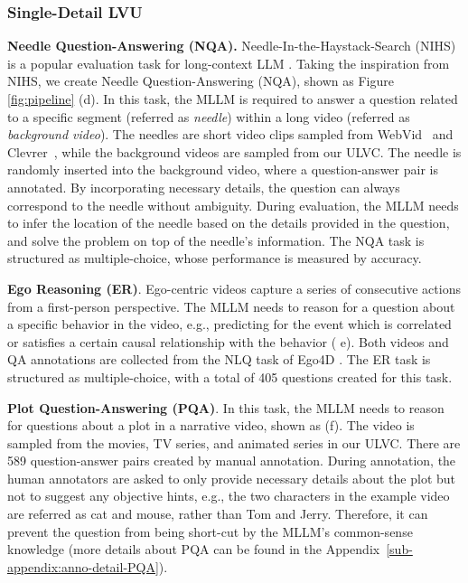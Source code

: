 \subsubsection{Single-Detail LVU}

\textbf{Needle Question-Answering (NQA).} Needle-In-the-Haystack-Search (NIHS) is a popular evaluation task for long-context LLM \cite{liu2024lost}. Taking the inspiration from NIHS, we create Needle Question-Answering (NQA), shown as Figure \ref{fig:pipeline} (d). In this task, the MLLM is required to answer a question related to a specific segment (referred as \textit{needle}) within a long video (referred as \textit{background video}). The needles are short video clips sampled from WebVid~\cite{webvid-2021} and Clevrer~\cite{clevrer-2019}, while the background videos are sampled from our ULVC. The needle is randomly inserted into the background video, where a question-answer pair is annotated. By incorporating necessary details, the question can always correspond to the needle without ambiguity. During evaluation, the MLLM needs to infer the location of the needle based on the details provided in the question, and solve the problem on top of the needle's information. The NQA task is structured as multiple-choice, whose performance is measured by accuracy. 

\noindent\textbf{Ego Reasoning (ER)}. Ego-centric videos capture a series of consecutive actions from a first-person perspective. The MLLM needs to reason for a question about a specific behavior in the video, e.g., predicting for the event which is correlated or satisfies a certain causal relationship with the behavior ( e). Both videos and QA annotations are collected from the NLQ task of Ego4D \cite{ego4d2022}. The ER task is structured as multiple-choice, with a total of 405 questions created for this task. 

\noindent\textbf{Plot Question-Answering (PQA)}. In this task, the MLLM needs to reason for questions about a plot in a narrative video, shown as  (f). The video is sampled from the movies, TV series, and animated series in our ULVC. There are 589  question-answer pairs created by manual annotation. During annotation, the human annotators are asked to only provide necessary details about the plot but not to suggest any objective hints, e.g., the two characters in the example video are referred as cat and mouse, rather than Tom and Jerry. Therefore, it can prevent the question from being short-cut by the MLLM's common-sense knowledge (more details about PQA can be found in the Appendix~\ref{sub-appendix:anno-detail-PQA}). 


